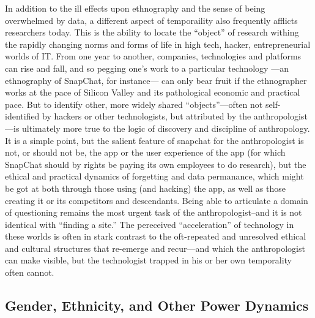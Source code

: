 \documentclass[10pt,letter,oneside]{scrartcl}
\begin{document}

In addition to the ill effects upon ethnography and the sense of being
overwhelmed by data, a different aspect of temporaility also
frequently afflicts researchers today.  This is the ability to locate
the ``object'' of research withing the rapidly changing norms and
forms of life in high tech, hacker, entrepreneurial worlds of IT.
From one year to another, companies, technologies and platforms can
rise and fall, and so pegging one's work to a particular technology
---an ethnography of SnapChat, for instance--- can only bear fruit if
the ethnographer works at the pace of Silicon Valley and its
pathological economic and practical pace.  But to identify other, more
widely shared ``objects''---often not self-identified by hackers or
other technologists, but attributed by the anthropologist---is
ultimately more true to the logic of discovery and discipline of
anthropology. It is a simple point, but the salient feature of
snapchat for the anthropologist is not, or should not be, the app or
the user experience of the app (for which SnapChat should by rights be
paying its own employees to do research), but the ethical and
practical dynamics of forgetting and data permanance, which might be
got at both through those using (and hacking) the app, as well as
those creating it or its competitors and descendants.   Being able to
articulate a domain of questioning remains the most urgent task of the
anthropologist--and it is not identical with ``finding a site.''  The
pereceived ``acceleration'' of technology in these worlds is often in
stark contrast to the oft-repeated and unresolved ethical and cultural
structures that re-emerge and recur---and which the anthropologist can
make visible, but the technologist trapped in his or her own
temporality often cannot.  %


\subsection{Gender, Ethnicity, and Other Power Dynamics} 
\end{document}
